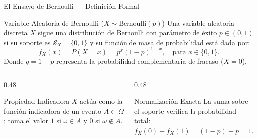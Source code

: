 \documentclass[10pt, aspectratio=169]{beamer}
\begin{document}
\begin{frame}{El Ensayo de Bernoulli — Definición Formal}
  \begin{block}{Variable Aleatoria de Bernoulli ($X \sim \text{Bernoulli}(p)$)}
    \footnotesize
    Una variable aleatoria discreta $X$ sigue una distribución de Bernoulli con parámetro de éxito $p \in (0, 1)$ si su soporte es $\mathcal{S}_X = \{0, 1\}$ y su función de masa de probabilidad está dada por:
    $$f_X(x) = P(X = x) = p^x (1-p)^{1-x}, \quad \text{para } x \in \{0, 1\}.$$
    Donde $q = 1-p$ representa la probabilidad complementaria de fracaso ($X=0$).
  \end{block}
  \vspace{-0.05cm}
  \pause
  \begin{columns}[T]
    \begin{column}{0.48\textwidth}
      \begin{exampleblock}{Propiedad Indicadora}
        \footnotesize
        $X$ actúa como la función indicadora de un evento $A \subset \Omega$: toma el valor $1$ si $\omega \in A$ y $0$ si $\omega \notin A$.
      \end{exampleblock}
    \end{column}
    \begin{column}{0.48\textwidth}
      \begin{alertblock}{Normalización Exacta}
        \footnotesize
        La suma sobre el soporte verifica la probabilidad total: $f_X(0) + f_X(1) = (1-p) + p = 1$.
      \end{alertblock}
    \end{column}
  \end{columns}
\end{frame}
\end{document}

